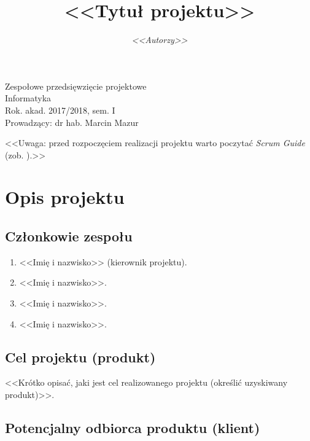 \documentclass[a4paper]{article}
\title{\bf{<<Tytuł projektu>>}}
\author{{\em <<Autorzy>>}}
\date{}
\begin{document}
\begin{titlepage}
\maketitle
\thispagestyle{empty}
\bigskip
\begin{center}
Zespołowe przedsięwzięcie projektowe\\[2mm]

Informatyka\\[2mm]

Rok. akad. 2017/2018, sem. I\\[2mm]

Prowadzący: dr hab. Marcin Mazur
\end{center}
\end{titlepage}

\tableofcontents
\thispagestyle{empty}

\newpage

<<Uwaga: przed rozpoczęciem realizacji projektu warto poczytać {\em Scrum Guide} (zob. \cite{SchSut}).>>

\section{Opis projektu}

\subsection{Członkowie zespołu}

\begin{enumerate}
\item <<Imię i nazwisko>> (kierownik projektu).
\item <<Imię i nazwisko>>.
\item <<Imię i nazwisko>>.
\item <<Imię i nazwisko>>.
\end{enumerate}

\subsection{Cel projektu (produkt)}

<<Krótko opisać, jaki jest cel realizowanego projektu (określić uzyskiwany produkt)>>.

\subsection{Potencjalny odbiorca produktu (klient)}
\end{document}

